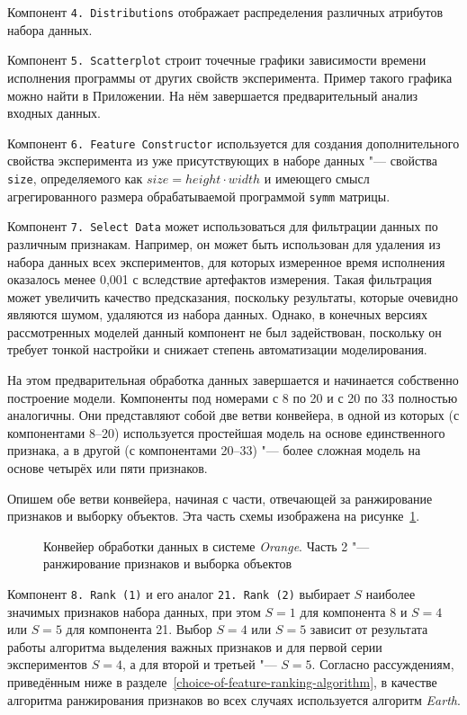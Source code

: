 Компонент \texttt{4.\,Distributions} отображает распределения различных атрибутов набора данных.

Компонент \texttt{5.\,Scatterplot} строит точечные графики зависимости времени исполнения программы от других свойств эксперимента. Пример такого графика можно найти в Приложении. На нём завершается предварительный анализ входных данных.

Компонент \texttt{6.\,Feature Constructor} используется для создания дополнительного свойства эксперимента из уже присутствующих в наборе данных "--- свойства \texttt{size}, определяемого как $size = height \cdot width$ и имеющего смысл агрегированного размера обрабатываемой программой \texttt{symm} матрицы.

Компонент \texttt{7.\,Select~Data} может использоваться для фильтрации данных по различным признакам. Например, он может быть использован для удаления из набора данных всех экспериментов, для которых измеренное время исполнения оказалось менее 0,001 с вследствие артефактов измерения. Такая фильтрация может увеличить качество предсказания, поскольку результаты, которые очевидно являются шумом, удаляются из набора данных. Однако, в конечных версиях рассмотренных моделей данный компонент не был задействован, поскольку он требует тонкой настройки и снижает степень автоматизации моделирования.

На этом предварительная обработка данных завершается и начинается собственно построение модели. Компоненты под номерами с 8 по 20 и с 20 по 33 полностью аналогичны. Они представляют собой две ветви конвейера, в одной из которых (с компонентами 8--20) используется простейшая модель на основе единственного признака, а в другой (с компонентами 20--33) "--- более сложная модель на основе четырёх или пяти признаков.

Опишем обе ветви конвейера, начиная с части, отвечающей за ранжирование признаков и выборку объектов. Эта часть схемы изображена на рисунке~\ref{img:series30-2}.

\begin{figure}
    \caption{Конвейер обработки данных в системе \textit{Orange}. Часть 2 "--- ранжирование признаков и выборка объектов}
    \label{img:series30-2}
\end{figure}

Компонент \texttt{8.\,Rank~(1)} и его аналог \texttt{21.\,Rank~(2)}  выбирает $S$ наиболее значимых признаков набора данных, при этом $S = 1$ для компонента 8 и $S = 4$ или $S = 5$ для компонента 21. Выбор $S = 4$ или $S = 5$ зависит от результата работы алгоритма выделения важных признаков и для первой серии экспериментов $S = 4$, а для второй и третьей "--- $S = 5$. Согласно рассуждениям, приведённым ниже в разделе~\ref{choice-of-feature-ranking-algorithm}, в качестве алгоритма ранжирования признаков во всех случаях используется алгоритм \textit{Earth}.

